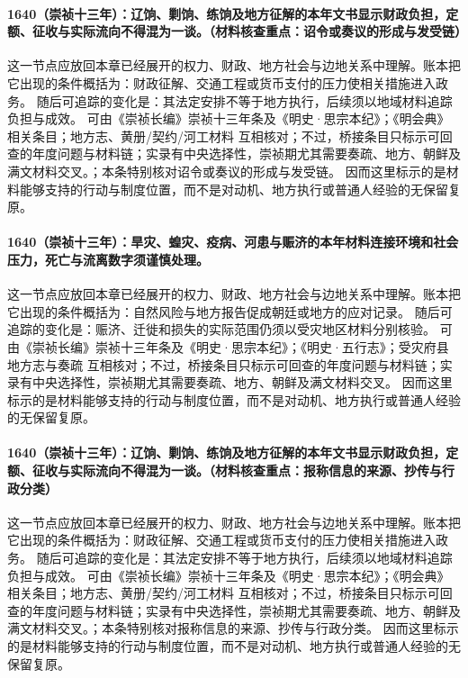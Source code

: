 \paragraph{1640（崇祯十三年）：辽饷、剿饷、练饷及地方征解的本年文书显示财政负担，定额、征收与实际流向不得混为一谈。（材料核查重点：诏令或奏议的形成与发受链）} 这一节点应放回本章已经展开的权力、财政、地方社会与边地关系中理解。账本把它出现的条件概括为：财政征解、交通工程或货币支付的压力使相关措施进入政务。 随后可追踪的变化是：其法定安排不等于地方执行，后续须以地域材料追踪负担与成效。 可由《崇祯长编》崇祯十三年条及《明史·思宗本纪》；《明会典》相关条目；地方志、黄册/契约/河工材料 互相核对；不过，桥接条目只标示可回查的年度问题与材料链；实录有中央选择性，崇祯期尤其需要奏疏、地方、朝鲜及满文材料交叉。；本条特别核对诏令或奏议的形成与发受链。 因而这里标示的是材料能够支持的行动与制度位置，而不是对动机、地方执行或普通人经验的无保留复原。

\paragraph{1640（崇祯十三年）：旱灾、蝗灾、疫病、河患与赈济的本年材料连接环境和社会压力，死亡与流离数字须谨慎处理。} 这一节点应放回本章已经展开的权力、财政、地方社会与边地关系中理解。账本把它出现的条件概括为：自然风险与地方报告促成朝廷或地方的应对记录。 随后可追踪的变化是：赈济、迁徙和损失的实际范围仍须以受灾地区材料分别核验。 可由《崇祯长编》崇祯十三年条及《明史·思宗本纪》；《明史·五行志》；受灾府县地方志与奏疏 互相核对；不过，桥接条目只标示可回查的年度问题与材料链；实录有中央选择性，崇祯期尤其需要奏疏、地方、朝鲜及满文材料交叉。 因而这里标示的是材料能够支持的行动与制度位置，而不是对动机、地方执行或普通人经验的无保留复原。

\paragraph{1640（崇祯十三年）：辽饷、剿饷、练饷及地方征解的本年文书显示财政负担，定额、征收与实际流向不得混为一谈。（材料核查重点：报称信息的来源、抄传与行政分类）} 这一节点应放回本章已经展开的权力、财政、地方社会与边地关系中理解。账本把它出现的条件概括为：财政征解、交通工程或货币支付的压力使相关措施进入政务。 随后可追踪的变化是：其法定安排不等于地方执行，后续须以地域材料追踪负担与成效。 可由《崇祯长编》崇祯十三年条及《明史·思宗本纪》；《明会典》相关条目；地方志、黄册/契约/河工材料 互相核对；不过，桥接条目只标示可回查的年度问题与材料链；实录有中央选择性，崇祯期尤其需要奏疏、地方、朝鲜及满文材料交叉。；本条特别核对报称信息的来源、抄传与行政分类。 因而这里标示的是材料能够支持的行动与制度位置，而不是对动机、地方执行或普通人经验的无保留复原。

